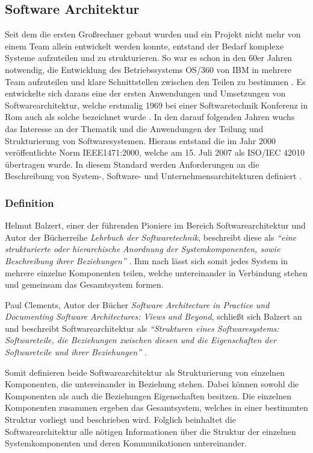 \subsection{Software Architektur}

Seit dem die ersten Großrechner gebaut wurden und ein Projekt nicht mehr von einem Team allein entwickelt werden konnte, entstand der Bedarf komplexe Systeme aufzuteilen und zu strukturieren. So war es schon in den 60er Jahren notwendig, die Entwicklung des  Betriebssystems OS/360 von IBM in mehrere Team aufzuteilen und klare Schnittstellen zwischen den Teilen zu bestimmen \parencite{brooks_mythical_1995}. Es entwickelte sich daraus eine der ersten Anwendungen und Umsetzungen von  Softwarearchitektur, welche erstmalig 1969 bei einer Softwaretechnik Konferenz in Rom auch als solche bezeichnet wurde \parencite[vgl.][S. 12]{buxton_software_1970}. In den darauf folgenden Jahren wuchs das Interesse an der Thematik und die Anwendungen der Teilung und Strukturierung von Softwaresystemen.
Hieraus entstand die im Jahr 2000 veröffentlichte Norm IEEE1471:2000, welche am 15. Juli 2007 als  ISO/IEC  42010 übertragen wurde. In diesem Standard werden Anforderungen an die Beschreibung von System-, Software- und Unternehmensarchitekturen definiert \parencite{hilliard_isoiecieee_nodate}.

\subsubsection{Definition}

Helmut Balzert, einer der führenden Pioniere im Bereich Softwarearchitektur und Autor der Bücherreihe \textit{Lehrbuch der Softwaretechnik}, beschreibt diese als \textit{\enquote{eine strukturierte oder hierarchische Anordnung der Systemkomponenten, sowie Beschreibung ihrer Beziehungen}} \parencite[][S. 580]{balzert_lehrbuch_2011}. Ihm nach lässt sich somit jedes System in mehrere einzelne Komponenten teilen, welche untereinander in Verbindung stehen und gemeinsam das Gesamtsystem formen.

Paul Clements, Autor der Bücher \textit{Software Architecture in Practice und Documenting Software Architectures: Views and Beyond}, schließt sich Balzert an und beschreibt Softwarearchitektur als \textit{\enquote{Strukturen eines Softwaresystems: Softwareteile, die Beziehungen zwischen diesen und die Eigenschaften der Softwareteile und ihrer Beziehungen}} \parencite[][S. 23]{clements_documenting_2010}.

Somit definieren beide Softwarearchitektur als Strukturierung von einzelnen Komponenten, die untereinander in Beziehung stehen. Dabei können sowohl die Komponenten als auch die Beziehungen Eigenschaften besitzen. Die einzelnen Komponenten zusammen ergeben das Gesamtsystem, welches in einer bestimmten Struktur vorliegt und beschrieben wird. Folglich beinhaltet die Softwarearchitektur alle nötigen Informationen über die Struktur der einzelnen Systemkomponenten und deren Kommunikationen untereinander.

